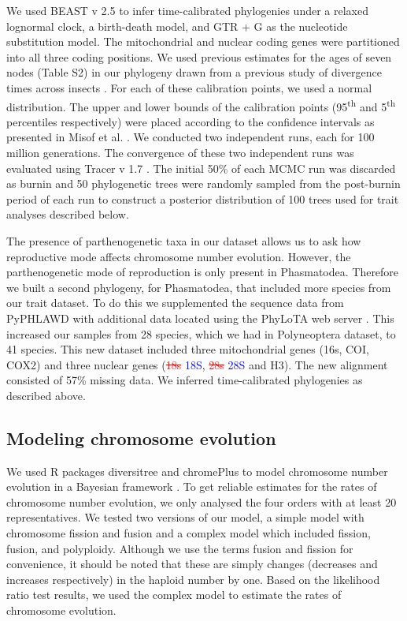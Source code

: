 \documentclass[]{rsos}%
\begin{document}
We used BEAST v 2.5 \cite{bouckaert2014beast} to infer time-calibrated phylogenies under a relaxed lognormal clock, a birth-death model, and GTR + G as the nucleotide substitution model.
The mitochondrial and nuclear coding genes were partitioned into all three coding positions. 
We used previous estimates for the ages of seven nodes (Table S2) in our phylogeny drawn from a previous study of divergence times across insects \cite{misof2014phylogenomics}.
For each of these calibration points, we used a normal distribution.
The upper and lower bounds of the calibration points (95\textsuperscript{th} and 5\textsuperscript{th} percentiles respectively) were placed according to the confidence intervals as presented in Misof et al. \cite{misof2014phylogenomics}. 
We conducted two independent runs, each for 100 million generations.
The convergence of these two independent runs was evaluated using Tracer v 1.7 \cite{rambaut2018tracer}.
The initial 50\% of each MCMC run was discarded as burnin and 50 phylogenetic trees were randomly sampled from the post-burnin period of each run to construct a posterior distribution of 100 trees used for trait analyses described below.

The presence of parthenogenetic taxa in our dataset allows us to ask how reproductive mode affects chromosome number evolution.
However, the parthenogenetic mode of reproduction is only present in Phasmatodea.
Therefore we built a second phylogeny, for Phasmatodea, that included more species from our trait dataset.
To do this we supplemented the sequence data from PyPHLAWD with additional data located using the PhyLoTA web server \cite{sanderson2008}.
This increased our samples from 28 species, which we had in Polyneoptera dataset, to 41 species. 
This new dataset included three mitochondrial genes (16s, COI, COX2) and three
nuclear genes (\textcolor{red}{\st{18s}} \textcolor{blue}{18S}, \textcolor{red}{\st{28s}} \textcolor{blue}{28S} and H3).
The new alignment consisted of 57\% missing data.
We inferred time-calibrated phylogenies as described above.


\subsection{Modeling chromosome evolution}
We used R packages diversitree and chromePlus to model chromosome number evolution in a Bayesian framework \cite{fitzjohn2012, blackmon2019meiotic}.
To get reliable estimates for the rates of chromosome number evolution, we only analysed the four orders with at least 20 representatives.
We tested two versions of our model, a simple model with chromosome fission and fusion and a complex model which included fission, fusion, and polyploidy.
Although we use the terms fusion and fission for convenience, it should be noted that these are simply changes (decreases and increases respectively) in the haploid number by one.
Based on the likelihood ratio test results, we used the complex model to estimate the rates of chromosome evolution.
\end{document}
